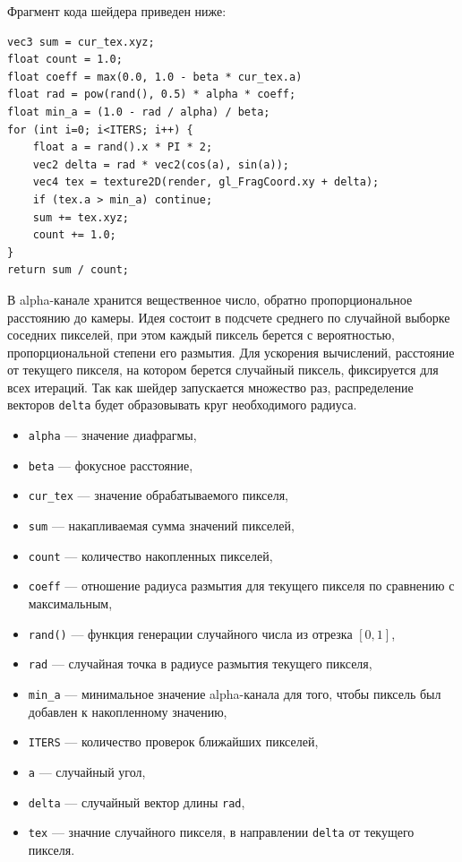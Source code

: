 Фрагмент кода шейдера приведен ниже:
\begin{verbatim}
vec3 sum = cur_tex.xyz;
float count = 1.0;
float coeff = max(0.0, 1.0 - beta * cur_tex.a)
float rad = pow(rand(), 0.5) * alpha * coeff;
float min_a = (1.0 - rad / alpha) / beta;
for (int i=0; i<ITERS; i++) {
    float a = rand().x * PI * 2;
    vec2 delta = rad * vec2(cos(a), sin(a));
    vec4 tex = texture2D(render, gl_FragCoord.xy + delta);
    if (tex.a > min_a) continue;
    sum += tex.xyz;
    count += 1.0;
}
return sum / count;
\end{verbatim}
В alpha-канале хранится вещественное число, обратно пропорциональное расстоянию до камеры. Идея состоит в подсчете среднего по случайной выборке соседних пикселей, при этом каждый пиксель берется с вероятностью, пропорциональной степени его размытия. Для ускорения вычислений, расстояние от текущего пикселя, на котором берется случайный пиксель, фиксируется для всех итераций. Так как шейдер запускается множество раз, распределение векторов \texttt{delta} будет образовывать круг необходимого радиуса.
\begin{itemize}
\item \texttt{alpha} --- значение диафрагмы,
\item \texttt{beta} --- фокусное расстояние,
\item \texttt{cur\_tex} --- значение обрабатываемого пикселя,
\item \texttt{sum} --- накапливаемая сумма значений пикселей,
\item \texttt{count} --- количество накопленных пикселей,
\item \texttt{coeff} --- отношение радиуса размытия для текущего пикселя по сравнению с максимальным,
\item \texttt{rand()} --- функция генерации случайного числа из отрезка $[0, 1]$,
\item \texttt{rad} --- случайная точка в радиусе размытия текущего пикселя,
\item \texttt{min\_a} --- минимальное значение alpha-канала для того, чтобы пиксель был добавлен к накопленному значению,
\item \texttt{ITERS} --- количество проверок ближайших пикселей,
\item \texttt{a} --- случайный угол,
\item \texttt{delta} --- случайный вектор длины \texttt{rad},
\item \texttt{tex} --- значние случайного пикселя, в направлении \texttt{delta} от текущего пикселя.
\end{itemize}

